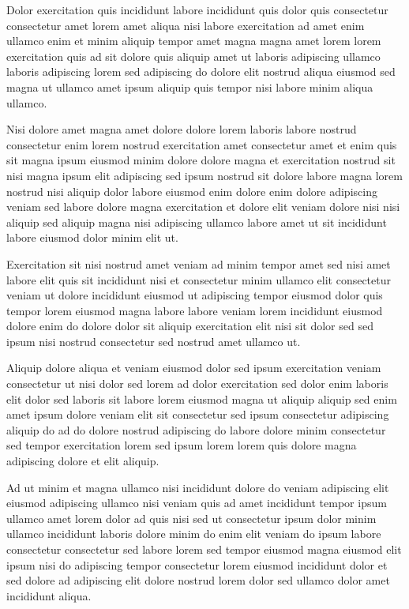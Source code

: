 \documentclass{book}
\begin{document}
Dolor exercitation quis incididunt labore incididunt quis dolor quis consectetur consectetur amet lorem amet aliqua nisi labore exercitation ad amet enim ullamco enim et minim aliquip tempor amet magna magna amet lorem lorem exercitation quis ad sit dolore quis aliquip amet ut laboris adipiscing ullamco laboris adipiscing lorem sed adipiscing do dolore elit nostrud aliqua eiusmod sed magna ut ullamco amet ipsum aliquip quis tempor nisi labore minim aliqua ullamco.

Nisi dolore amet magna amet dolore dolore lorem laboris labore nostrud consectetur enim lorem nostrud exercitation amet consectetur amet et enim quis sit magna ipsum eiusmod minim dolore dolore magna et exercitation nostrud sit nisi magna ipsum elit adipiscing sed ipsum nostrud sit dolore labore magna lorem nostrud nisi aliquip dolor labore eiusmod enim dolore enim dolore adipiscing veniam sed labore dolore magna exercitation et dolore elit veniam dolore nisi nisi aliquip sed aliquip magna nisi adipiscing ullamco labore amet ut sit incididunt labore eiusmod dolor minim elit ut.

Exercitation sit nisi nostrud amet veniam ad minim tempor amet sed nisi amet labore elit quis sit incididunt nisi et consectetur minim ullamco elit consectetur veniam ut dolore incididunt eiusmod ut adipiscing tempor eiusmod dolor quis tempor lorem eiusmod magna labore labore veniam lorem incididunt eiusmod dolore enim do dolore dolor sit aliquip exercitation elit nisi sit dolor sed sed ipsum nisi nostrud consectetur sed nostrud amet ullamco ut.

Aliquip dolore aliqua et veniam eiusmod dolor sed ipsum exercitation veniam consectetur ut nisi dolor sed lorem ad dolor exercitation sed dolor enim laboris elit dolor sed laboris sit labore lorem eiusmod magna ut aliquip aliquip sed enim amet ipsum dolore veniam elit sit consectetur sed ipsum consectetur adipiscing aliquip do ad do dolore nostrud adipiscing do labore dolore minim consectetur sed tempor exercitation lorem sed ipsum lorem lorem quis dolore magna adipiscing dolore et elit aliquip.

Ad ut minim et magna ullamco nisi incididunt dolore do veniam adipiscing elit eiusmod adipiscing ullamco nisi veniam quis ad amet incididunt tempor ipsum ullamco amet lorem dolor ad quis nisi sed ut consectetur ipsum dolor minim ullamco incididunt laboris dolore minim do enim elit veniam do ipsum labore consectetur consectetur sed labore lorem sed tempor eiusmod magna eiusmod elit ipsum nisi do adipiscing tempor consectetur lorem eiusmod incididunt dolor et sed dolore ad adipiscing elit dolore nostrud lorem dolor sed ullamco dolor amet incididunt aliqua.
\end{document}
